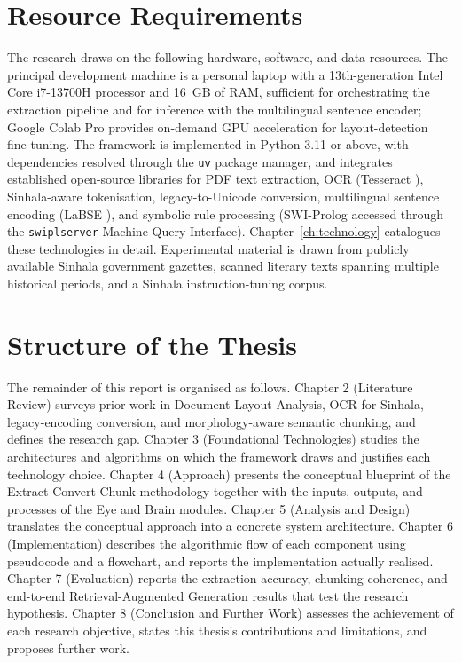 \documentclass[12pt,a4paper,oneside]{report}
\begin{document}
\section{Resource Requirements}
\label{sec:resources}
The research draws on the following hardware, software, and data resources. The principal development machine is a personal laptop with a 13th-generation Intel Core i7-13700H processor and 16~GB of RAM, sufficient for orchestrating the extraction pipeline and for inference with the multilingual sentence encoder; Google Colab Pro provides on-demand GPU acceleration for layout-detection fine-tuning. The framework is implemented in Python 3.11 or above, with dependencies resolved through the \texttt{uv} package manager, and integrates established open-source libraries for PDF text extraction, OCR (Tesseract \cite{smith2007tesseract}), Sinhala-aware tokenisation, legacy-to-Unicode conversion, multilingual sentence encoding (LaBSE \cite{feng2022labse, reimers2019sbert}), and symbolic rule processing (SWI-Prolog accessed through the \texttt{swiplserver} Machine Query Interface). Chapter~\ref{ch:technology} catalogues these technologies in detail. Experimental material is drawn from publicly available Sinhala government gazettes, scanned literary texts spanning multiple historical periods, and a Sinhala instruction-tuning corpus.

\section{Structure of the Thesis}
\label{sec:thesis-structure}
The remainder of this report is organised as follows. Chapter 2 (Literature Review) surveys prior work in Document Layout Analysis, OCR for Sinhala, legacy-encoding conversion, and morphology-aware semantic chunking, and defines the research gap. Chapter 3 (Foundational Technologies) studies the architectures and algorithms on which the framework draws and justifies each technology choice. Chapter 4 (Approach) presents the conceptual blueprint of the Extract-Convert-Chunk methodology together with the inputs, outputs, and processes of the Eye and Brain modules. Chapter 5 (Analysis and Design) translates the conceptual approach into a concrete system architecture. Chapter 6 (Implementation) describes the algorithmic flow of each component using pseudocode and a flowchart, and reports the implementation actually realised. Chapter 7 (Evaluation) reports the extraction-accuracy, chunking-coherence, and end-to-end Retrieval-Augmented Generation results that test the research hypothesis. Chapter 8 (Conclusion and Further Work) assesses the achievement of each research objective, states this thesis's contributions and limitations, and proposes further work.
\end{document}
